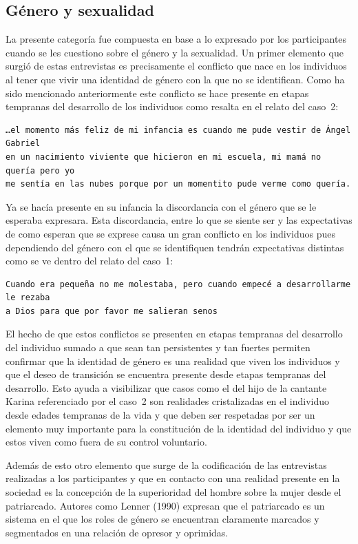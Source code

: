 \subsection{Género y sexualidad}

La presente categoría fue compuesta en base a lo expresado por los participantes
cuando se les cuestiono sobre el género y la sexualidad. Un primer elemento que
surgió de estas entrevistas es precisamente el conflicto que nace en los
individuos al tener que vivir una identidad de género con la que no se
identifican. Como ha sido mencionado anteriormente este conflicto se hace
presente en etapas tempranas del desarrollo de los individuos como resalta en el
relato del caso~2:

\begin{verbatim}
…el momento más feliz de mi infancia es cuando me pude vestir de Ángel Gabriel
en un nacimiento viviente que hicieron en mi escuela, mi mamá no quería pero yo
me sentía en las nubes porque por un momentito pude verme como quería.
\end{verbatim}

Ya se hacía presente en su infancia la discordancia con el género que se le
esperaba expresara. Esta discordancia, entre lo que se siente ser y las
expectativas de como esperan que se exprese causa un gran conflicto en los
individuos pues dependiendo del género con el que se identifiquen tendrán
expectativas distintas como se ve dentro del relato del caso~1:

\begin{verbatim}
Cuando era pequeña no me molestaba, pero cuando empecé a desarrollarme le rezaba
a Dios para que por favor me salieran senos
\end{verbatim}

El hecho de que estos conflictos se presenten en etapas tempranas del desarrollo
del individuo sumado a que sean tan persistentes y tan fuertes permiten
confirmar que la identidad de género es una realidad que viven los individuos y
que el deseo de transición se encuentra presente desde etapas tempranas del
desarrollo. Esto ayuda a visibilizar que casos como el del hijo de la cantante
Karina referenciado por el caso~2 son realidades cristalizadas en el individuo
desde edades tempranas de la vida y que deben ser respetadas por ser un elemento
muy importante para la constitución de la identidad del individuo y que estos
viven como fuera de su control voluntario.

Además de esto otro elemento que surge de la codificación de las entrevistas
realizadas a los participantes y que en contacto con una realidad presente en la
sociedad es la concepción de la superioridad del hombre sobre la mujer desde el
patriarcado. Autores como Lenner (1990) expresan que el patriarcado es un
sistema en el que los roles de género se encuentran claramente marcados y
segmentados en una relación de opresor y oprimidas.


